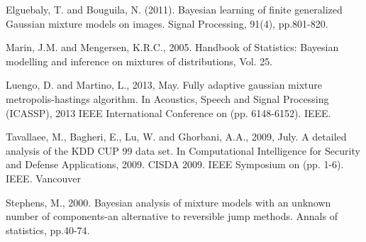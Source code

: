 \documentclass[conference]{llncs}
\begin{document}
\begin{thebibliography}{[MT1]}
 Elguebaly, T. and Bouguila, N. (2011). Bayesian learning of finite generalized Gaussian mixture models on images. Signal Processing, 91(4), pp.801-820.

 Marin, J.M. and Mengersen, K.R.C., 2005. Handbook of Statistics: Bayesian modelling and inference on mixtures of distributions, Vol. 25.

 Luengo, D. and Martino, L., 2013, May. Fully adaptive gaussian mixture metropolis-hastings algorithm. In Acoustics, Speech and Signal Processing (ICASSP), 2013 IEEE International Conference on (pp. 6148-6152). IEEE.

 Tavallaee, M., Bagheri, E., Lu, W. and Ghorbani, A.A., 2009, July. A detailed analysis of the KDD CUP 99 data set. In Computational Intelligence for Security and Defense Applications, 2009. CISDA 2009. IEEE Symposium on (pp. 1-6). IEEE.
Vancouver	

 Stephens, M., 2000. Bayesian analysis of mixture models with an unknown number of components-an alternative to reversible jump methods. Annals of statistics, pp.40-74.

\end{thebibliography}
\end{document}
